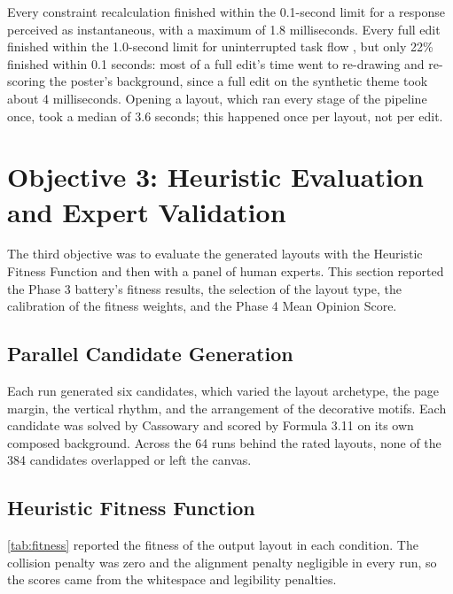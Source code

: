 \begin{refsection}
Every constraint recalculation finished within the 0.1-second limit for a response perceived as instantaneous, with a maximum of 1.8 milliseconds. Every full edit finished within the 1.0-second limit for uninterrupted task flow \cite{nielsen1993usability}, but only 22\% finished within 0.1 seconds: most of a full edit's time went to re-drawing and re-scoring the poster's background, since a full edit on the synthetic theme took about 4 milliseconds. Opening a layout, which ran every stage of the pipeline once, took a median of 3.6 seconds; this happened once per layout, not per edit.

\section{Objective 3: Heuristic Evaluation and Expert Validation}

The third objective was to evaluate the generated layouts with the Heuristic Fitness Function and then with a panel of human experts. This section reported the Phase 3 battery's fitness results, the selection of the layout type, the calibration of the fitness weights, and the Phase 4 Mean Opinion Score.

\subsection{Parallel Candidate Generation}

Each run generated six candidates, which varied the layout archetype, the page margin, the vertical rhythm, and the arrangement of the decorative motifs. Each candidate was solved by Cassowary and scored by Formula 3.11 on its own composed background. Across the 64 runs behind the rated layouts, none of the 384 candidates overlapped or left the canvas.

\subsection{Heuristic Fitness Function}

\ref{tab:fitness} reported the fitness of the output layout in each condition. The collision penalty was zero and the alignment penalty negligible in every run, so the scores came from the whitespace and legibility penalties.


\end{refsection}
